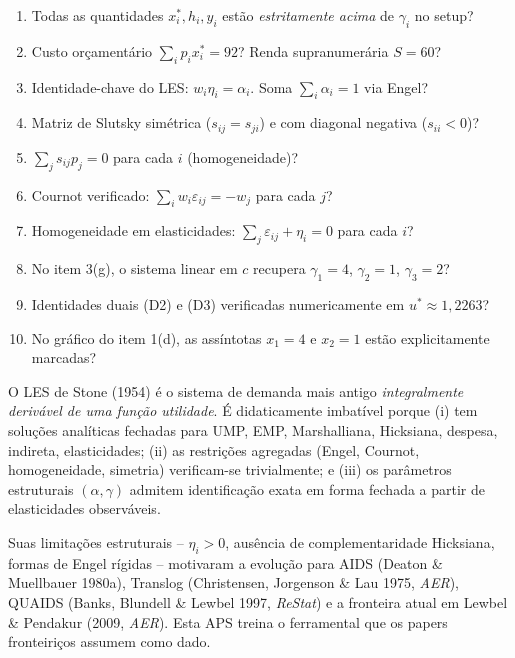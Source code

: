 \documentclass[11pt,addpoints]{exam}
\begin{document}
\medskip
\begin{enumerate}[label=$\square$,leftmargin=*]
\item Todas as quantidades $x_i^*, h_i, y_i$ estão \emph{estritamente acima} de $\gamma_i$ no setup?
\item Custo orçamentário $\sum_i p_i x_i^* = 92$? Renda supranumerária $S = 60$?
\item Identidade-chave do LES: $w_i \eta_i = \alpha_i$. Soma $\sum_i \alpha_i = 1$ via Engel?
\item Matriz de Slutsky simétrica ($s_{ij} = s_{ji}$) e com diagonal negativa ($s_{ii} < 0$)?
\item $\sum_j s_{ij} p_j = 0$ para cada $i$ (homogeneidade)?
\item Cournot verificado: $\sum_i w_i \varepsilon_{ij} = -w_j$ para cada $j$?
\item Homogeneidade em elasticidades: $\sum_j \varepsilon_{ij} + \eta_i = 0$ para cada $i$?
\item No item 3(g), o sistema linear em $c$ recupera $\gamma_1 = 4$, $\gamma_2 = 1$, $\gamma_3 = 2$?
\item Identidades duais (D2) e (D3) verificadas numericamente em $u^* \approx 1{,}2263$?
\item No gráfico do item 1(d), as assíntotas $x_1 = 4$ e $x_2 = 1$ estão explicitamente marcadas?
\end{enumerate}

\vspace{1em}
\begin{contextbox}
\small
O LES de Stone (1954) é o sistema de demanda mais antigo \emph{integralmente derivável de uma função utilidade}. É didaticamente imbatível porque (i) tem soluções analíticas fechadas para UMP, EMP, Marshalliana, Hicksiana, despesa, indireta, elasticidades; (ii) as restrições agregadas (Engel, Cournot, homogeneidade, simetria) verificam-se trivialmente; e (iii) os parâmetros estruturais $(\alpha, \gamma)$ admitem identificação exata em forma fechada a partir de elasticidades observáveis.

Suas limitações estruturais -- $\eta_i > 0$, ausência de complementaridade Hicksiana, formas de Engel rígidas -- motivaram a evolução para AIDS (Deaton \& Muellbauer 1980a), Translog (Christensen, Jorgenson \& Lau 1975, \textit{AER}), QUAIDS (Banks, Blundell \& Lewbel 1997, \textit{ReStat}) e a fronteira atual em Lewbel \& Pendakur (2009, \textit{AER}). Esta APS treina o ferramental que os papers fronteiriços assumem como dado.
\end{contextbox}
\end{document}
